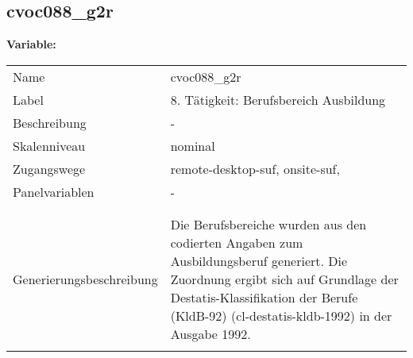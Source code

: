 	
	
	\subsection{cvoc088\_g2r}
	\label{subSection:cvoc088_g2r}

	\noindent\textbf{Variable:}\\
		\begin{tabular}{lL{11.3cm}}
			\label{tableVariable:cvoc088_g2r}
			Name & cvoc088\_g2r \\
			Label & 8. Tätigkeit: Berufsbereich Ausbildung \\
			Beschreibung & - \\
			Skalenniveau & nominal \\
			Zugangswege &
				remote-desktop-suf,
				onsite-suf,
 \\
			Panelvariablen & -
			 \\
			 \\
 \\
					Generierungsbeschreibung & Die Berufsbereiche wurden aus den codierten Angaben zum Ausbildungsberuf generiert. Die Zuordnung ergibt sich auf Grundlage der Destatis-Klassifikation der Berufe (KldB-92) (cl-destatis-kldb-1992) in der Ausgabe 1992. 
				 \\	
			 \\
		\end{tabular}






